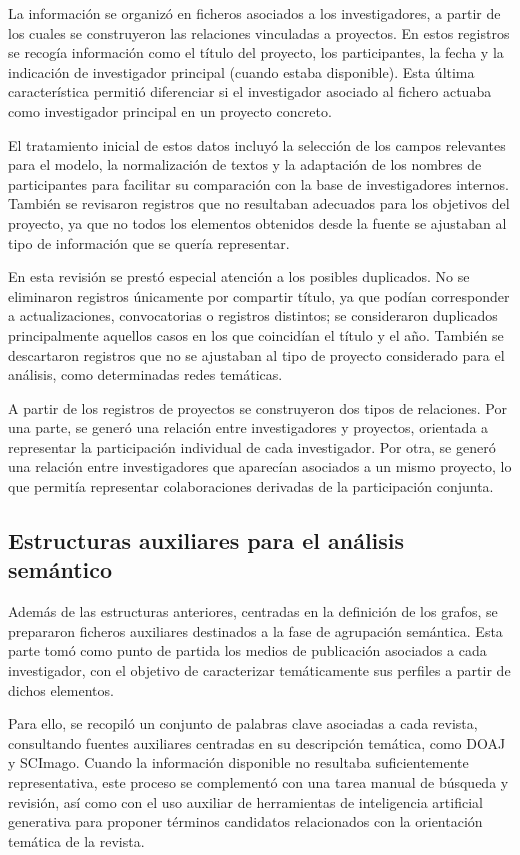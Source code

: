 \documentclass[11pt,spanish,listoffigures,listoftables]{tfgetsinf}
\begin{document}
La información se organizó en ficheros asociados a los investigadores, a partir de los cuales se construyeron las relaciones vinculadas a proyectos. En estos registros se recogía información como el título del proyecto, los participantes, la fecha y la indicación de investigador principal (cuando estaba disponible). Esta última característica permitió diferenciar si el investigador asociado al fichero actuaba como investigador principal en un proyecto concreto.

El tratamiento inicial de estos datos incluyó la selección de los campos relevantes para el modelo, la normalización de textos y la adaptación de los nombres de participantes para facilitar su comparación con la base de investigadores internos. También se revisaron registros que no resultaban adecuados para los objetivos del proyecto, ya que no todos los elementos obtenidos desde la fuente se ajustaban al tipo de información que se quería representar.

En esta revisión se prestó especial atención a los posibles duplicados. No se eliminaron registros únicamente por compartir título, ya que podían corresponder a actualizaciones, convocatorias o registros distintos; se consideraron duplicados principalmente aquellos casos en los que coincidían el título y el año. También se descartaron registros que no se ajustaban al tipo de proyecto considerado para el análisis, como determinadas redes temáticas.

A partir de los registros de proyectos se construyeron dos tipos de relaciones. Por una parte, se generó una relación entre investigadores y proyectos, orientada a representar la participación individual de cada investigador. Por otra, se generó una relación entre investigadores que aparecían asociados a un mismo proyecto, lo que permitía representar colaboraciones derivadas de la participación conjunta.

\subsection{Estructuras auxiliares para el análisis semántico}

Además de las estructuras anteriores, centradas en la definición de los grafos, se prepararon ficheros auxiliares destinados a la fase de agrupación semántica. Esta parte tomó como punto de partida los medios de publicación asociados a cada investigador, con el objetivo de caracterizar temáticamente sus perfiles a partir de dichos elementos.

Para ello, se recopiló un conjunto de palabras clave asociadas a cada revista, consultando fuentes auxiliares centradas en su descripción temática, como DOAJ y SCImago. Cuando la información disponible no resultaba suficientemente representativa, este proceso se complementó con una tarea manual de búsqueda y revisión, así como con el uso auxiliar de herramientas de inteligencia artificial generativa para proponer términos candidatos relacionados con la orientación temática de la revista.
\end{document}
